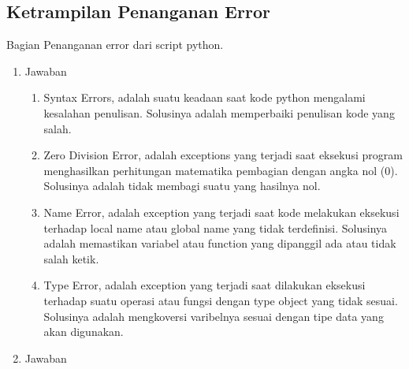 \subsection{Ketrampilan Penanganan Error}
Bagian Penanganan error dari script python.
\begin{enumerate}
\item Jawaban
\begin{enumerate}
\item Syntax Errors, adalah suatu keadaan saat kode python mengalami kesalahan penulisan. Solusinya adalah memperbaiki penulisan kode yang salah.

\item Zero Division Error, adalah exceptions yang terjadi saat eksekusi program menghasilkan perhitungan matematika pembagian dengan angka nol (0). Solusinya adalah tidak membagi suatu yang hasilnya nol.

\item Name Error, adalah exception yang terjadi saat kode melakukan eksekusi terhadap local name atau global name yang tidak terdefinisi. Solusinya adalah memastikan variabel atau function yang dipanggil ada atau tidak salah ketik.

\item Type Error, adalah exception yang terjadi saat dilakukan eksekusi terhadap suatu operasi atau fungsi dengan type object yang tidak sesuai. Solusinya adalah mengkoversi varibelnya sesuai dengan tipe data yang akan digunakan.

\end{enumerate}
\item Jawaban																	

\end{enumerate}